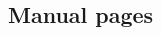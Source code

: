 \documentclass[class=book, crop=false]{standalone}
\begin{document}
\begin{CJK}{UTF8}{gbsn}

\chapter{Manual pages}



\cleardoublepage

\end{CJK}
\end{document}
